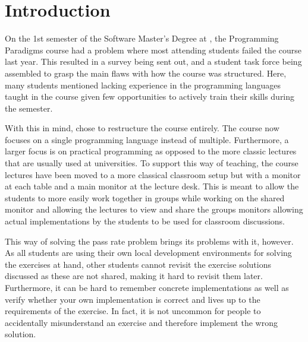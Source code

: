\chapter{Introduction} \label{chap:introduction}
On the 1st semester of the Software Master’s Degree at \aau{}, the Programming Paradigms course had a problem where most attending students failed the course last year. 
This resulted in a survey being sent out, and a student task force being assembled to grasp the main flaws with how the course was structured. 
Here, many students mentioned lacking experience in the programming languages taught in the course given few opportunities to actively train their skills during the semester. 


With this in mind, \aau{} chose to restructure the course entirely. The course now focuses on a single programming language instead of multiple. Furthermore, a larger focus is on practical programming as opposed to the more classic lectures that are usually used at universities. To support this way of teaching, the course lectures have been moved to a more classical classroom setup but with a monitor at each table and a main monitor at the lecture desk. This is meant to allow the students to more easily work together in groups while working on the shared monitor and allowing the lectures to view and share the groups monitors allowing actual implementations by the students to be used for classroom discussions. 


This way of solving the pass rate problem brings its problems with it, however. As all students are using their own local development environments for solving the exercises at hand, other students cannot revisit the exercise solutions discussed as these are not shared, making it hard to revisit them later. Furthermore, it can be hard to remember concrete implementations as well as verify whether your own implementation is correct and lives up to the requirements of the exercise. In fact, it is not uncommon for people to accidentally misunderstand an exercise and therefore implement the wrong solution.  

